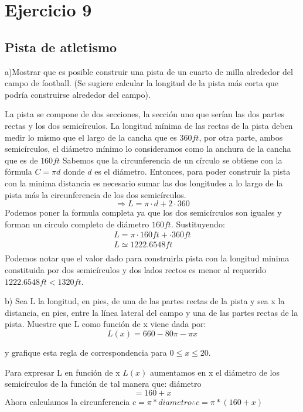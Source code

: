 \chapter*{Ejercicio 9}
\section*{Pista de atletismo}
a)Mostrar que es posible construir una pista de un cuarto de milla alrededor del
campo de football. (Se sugiere calcular la longitud de la pista más corta que podría
construirse alrededor del campo).

\vspace{0.1cm}

La pista se compone de dos secciones, la sección uno que serían las dos partes rectas y los dos semicírculos. La longitud mínima de las rectas de la pista deben medir lo mismo que el largo de la cancha que es $360ft$, por otra parte, ambos semicírculos, el diámetro mínimo lo consideramos como la anchura de la cancha que es de $160ft$
Sabemos que la circunferencia de un círculo se obtiene con la fórmula $C=\pi d$ donde $d$ es el diámetro.
Entonces, para poder construir la pista con la minima distancia es necesario sumar las dos longitudes a lo largo de la pista más la circunferencia de los dos semicírculos.
$$\Rightarrow L=\pi \cdot d + 2\cdot 360$$
Podemos poner la formula completa ya que los dos semicírculos son iguales y forman un circulo completo de diámetro $160ft$.
Sustituyendo: 
\begin{gather*}
    L=\pi\cdot160ft+\cdot360ft\\
    L\simeq 1222.6548ft\\
\end{gather*}
Podemos notar que el valor dado para construirla pista con la longitud minima constituida por dos semicírculos y dos lados rectos es menor al requerido $1222.6548ft<1320ft$.
\vspace{0.2cm}

b) Sea L la longitud, en pies, de una de las partes rectas de la pista y sea x la distancia, en pies, entre la línea lateral del campo y una de las partes rectas de la pista. Muestre que L como función de x viene dada por:
$$L(x) = 660 - 80 \pi - \pi x$$

y grafique esta regla de correspondencia para $0 \leq x \leq 20$.
\vspace{0.2cm}

Para expresar L en función de x $L(x)$ aumentamos en x el diámetro de los semicírculos de la función de tal manera que: diámetro $$=160 + x$$
Ahora calculamos la circunferencia  $c=\pi*diametro\therefore c=\pi*(160+x)$

